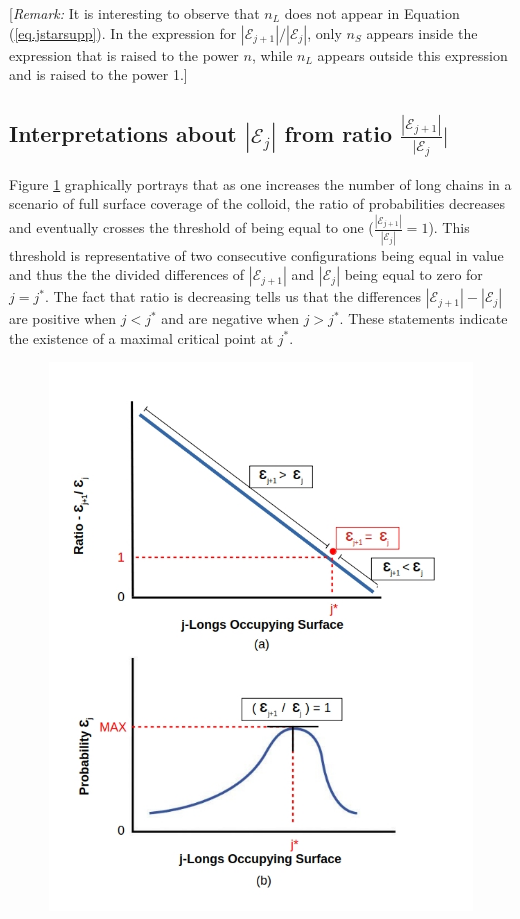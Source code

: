 \documentclass[journal=mamobx,manuscript=article]{achemso}
\begin{document}
[\textit{Remark:}  It is interesting to observe that $n_L$ does not appear in Equation (\ref{eq.jstarsupp}).  
In the expression for $|\mathcal{E}_{j+1}|/|\mathcal{E}_j|$,   only $n_S$ appears inside the 
expression that is raised to the power $n$, while $n_L$ appears outside this expression and is
raised to the power 1.]  

\subsection{Interpretations about $|\mathcal{E}_{j}|$ from ratio $\frac{|\mathcal{E}_{j+1}|}{|\mathcal{E}_{j}}|$}



Figure \ref{figure 9} graphically portrays 
that as one increases the number of long chains in a scenario of full surface coverage of the colloid, the ratio of probabilities decreases and 
eventually crosses the threshold of 
being equal to one ($\frac{|\mathcal{E}_{j+1}|}{|\mathcal{E}_{j}|}=1$). 
This threshold is representative of two consecutive configurations being equal in value and thus the the divided differences of $|\mathcal{E}_{j+1}|$ and $|\mathcal{E}_{j}|$ being equal to zero for $j=j^*$.  
The fact that ratio is decreasing tells us that 
the differences $|\mathcal{E}_{j+1}|-|\mathcal{E}_{j}|$
are positive when $j<j^*$ and are negative when $j>j^*$.
These statements indicate the existence of a maximal critical point at $j^*$.

\begin{figure}[H]
\includegraphics[scale=0.50]{fig9ab.jpg}
\caption{}
\label{figure 9}
\end{figure}
\end{document}
